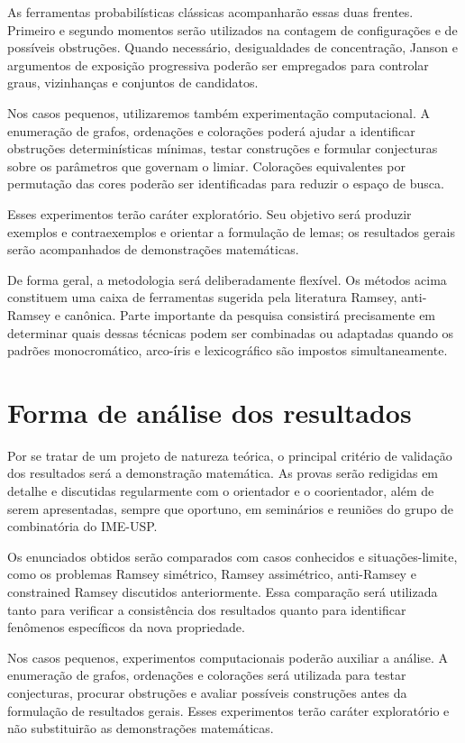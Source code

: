 \documentclass[11pt,a4paper]{article}
\theoremstyle{plain}
\theoremstyle{definition}
\begin{document}
As ferramentas probabilísticas clássicas acompanharão essas duas
frentes. Primeiro e segundo momentos serão utilizados na contagem de
configurações e de possíveis obstruções. Quando necessário,
desigualdades de concentração, Janson e argumentos de exposição
progressiva poderão ser empregados para controlar graus,
vizinhanças e conjuntos de candidatos.

Nos casos pequenos, utilizaremos também experimentação computacional.
A enumeração de grafos, ordenações e colorações poderá ajudar a
identificar obstruções determinísticas mínimas, testar construções e
formular conjecturas sobre os parâmetros que governam o limiar.
Colorações equivalentes por permutação das cores poderão ser
identificadas para reduzir o espaço de busca.

Esses experimentos terão caráter exploratório. Seu objetivo será
produzir exemplos e contraexemplos e orientar a formulação de lemas;
os resultados gerais serão acompanhados de demonstrações matemáticas.

De forma geral, a metodologia será deliberadamente flexível. Os
métodos acima constituem uma caixa de ferramentas sugerida pela
literatura Ramsey, anti-Ramsey e canônica. Parte importante da pesquisa
consistirá precisamente em determinar quais dessas técnicas podem ser
combinadas ou adaptadas quando os padrões monocromático, arco-íris e
lexicográfico são impostos simultaneamente.


\section{Forma de análise dos resultados}


Por se tratar de um projeto de natureza teórica, o principal critério de
validação dos resultados será a demonstração matemática. As provas serão
redigidas em detalhe e discutidas regularmente com o orientador e o
coorientador, além de serem apresentadas, sempre que oportuno, em seminários
e reuniões do grupo de combinatória do IME-USP.

Os enunciados obtidos serão comparados com casos conhecidos e situações-limite,
como os problemas Ramsey simétrico, Ramsey assimétrico, anti-Ramsey e
constrained Ramsey discutidos anteriormente. Essa comparação será utilizada
tanto para verificar a consistência dos resultados quanto para identificar
fenômenos específicos da nova propriedade.

Nos casos pequenos, experimentos computacionais poderão auxiliar a análise.
A enumeração de grafos, ordenações e colorações será utilizada para testar
conjecturas, procurar obstruções e avaliar possíveis construções antes da
formulação de resultados gerais. Esses experimentos terão caráter exploratório
e não substituirão as demonstrações matemáticas.
\end{document}
